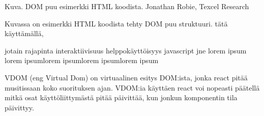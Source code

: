 Kuva\getImgCount .{} DOM puu esimerkki HTML koodista. Jonathan Robie, Texcel Research 
\medskip

Kuvassa on esimerkki HTML koodista tehty DOM puu struktuuri.
tätä käyttämällä, 

jotain rajapinta interaktiivisuus helppokäyttöisyys javascript jne lorem ipsum lorem ipsumlorem ipsumlorem ipsumlorem ipsum

\bigskip




VDOM (eng Virtual Dom) on virtuaalinen esitys DOM:ista, jonka react pitää musitissaan koko suorituksen ajan.
VDOM:ia käyttäen react voi nopeasti päätellä mitkä osat käyttöliittymästä pitää päivittää, kun jonkun komponentin tila päivittyy. 
\medskip



